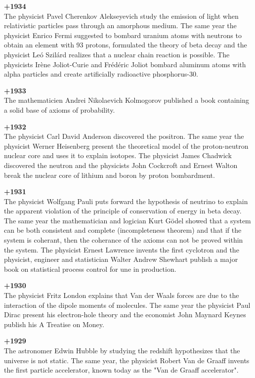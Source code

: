 \textbf{+1934}\\
The physicist Pavel Cherenkov Alekseyevich study the emission of light when relativistic particles pass through an amorphous medium. The same year the physicist Enrico Fermi suggested to bombard uranium atoms with neutrons to obtain an element with 93 protons, formulated the theory of beta decay and the physicist Leó Szilárd realizes that a nuclear chain reaction is possible. The physicists Irène Joliot-Curie and Frédéric Joliot bombard aluminum atoms with alpha particles and create artificially radioactive phosphorus-30.

\textbf{+1933}\\
The mathematicien Andrei Nikolaevich Kolmogorov published a book containing a solid base of axioms of probability.

\pagebreak
\textbf{+1932}\\
The physicist Carl David Anderson discovered the positron. The same year the physicist Werner Heisenberg present the theoretical model of the proton-neutron nuclear core and uses it to explain isotopes. The physicist James Chadwick discovered the neutron and the physicists John Cockcroft and Ernest Walton break the nuclear core of lithium and boron by proton bombardment.

\textbf{+1931}\\
The physicist Wolfgang Pauli puts forward the hypothesis of neutrino to explain the apparent violation of the principle of conservation of energy in beta decay. The same year the mathematician and logician Kurt Gödel showed that a system can be both consistent and complete (incompleteness theorem) and that if the system is coherant, then the coherance of the axioms can not be proved within the system. The physicist Ernest Lawrence invents the first cyclotron and the physicist, engineer and statistician Walter Andrew Shewhart publish a major book on statistical process control for une in production.

\textbf{+1930}\\
The physicist Fritz London explains that Van der Waals forces are due to the interaction of the dipole moments of molecules. The same year the physicist Paul Dirac present his electron-hole theory and the economist John Maynard Keynes publish his A Treatise on Money.

\textbf{+1929}\\
The astronomer Edwin Hubble by studying the redshift hypothesizes that the universe is not static. The same year, the physicist Robert Van de Graaff invents the first particle accelerator, known today as the "Van de Graaff accelerator".


